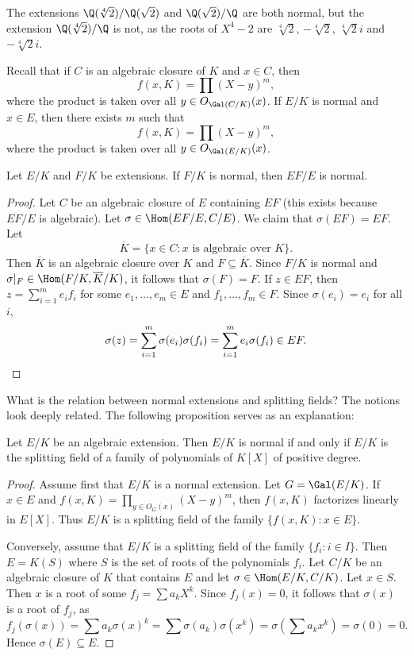 \begin{example}
The extensions $\Q(\sqrt[4]{2})/\Q(\sqrt{2})$ and $\Q(\sqrt{2})/\Q$ are both
normal, but the extension $\Q(\sqrt[4]{2})/\Q$ is not, 
as the roots of $X^4-2$ are
$\sqrt[4]{2}$, $-\sqrt[4]{2}$, $\sqrt[4]{2}i$ and $-\sqrt[4]{2}i$.
\end{example}


Recall that if $C$ is an algebraic closure of $K$ and $x\in C$,
then 
\[
f(x,K)=\prod(X-y)^m,
\]
where the product is taken over all 
$y\in O_{\Gal(C/K)}(x)$. 
If $E/K$ is normal and $x\in E$, then there exists $m$ such that 
\[
f(x,K)=\prod(X-y)^m,
\]
where the product is taken over all 
$y\in O_{\Gal(E/K)}(x)$. 

\begin{proposition}
    Let $E/K$ and $F/K$ be extensions. If $F/K$ 
    is normal, then $EF/E$ is normal.
\end{proposition}

\begin{proof}
    Let $C$ be an algebraic closure of $E$ containing $EF$ (this exists because $EF/E$ is algebraic). 
    Let $\sigma\in\Hom(EF/E,C/E)$. We claim that $\sigma(EF)=EF$. Let 
    \[
    \overline{K}=\{x\in C:x\text{ is algebraic over $K$}\}.
    \]
    Then $\overline{K}$ is an algebraic closure over $K$ and $F\subseteq\overline{K}$. 
    Since $F/K$ is normal and $\sigma|_F\in\Hom(F/K,\overline{K}/K)$, 
    it follows that $\sigma(F)=F$. If $z\in EF$, then
    $z=\sum_{i=1}^m e_if_i$ for some $e_1,\dots,e_m\in E$ and 
    $f_1,\dots,f_m\in F$. Since $\sigma(e_i)=e_i$ for all $i$,  
    \[
    \sigma(z)=\sum_{i=1}^m\sigma(e_i)\sigma(f_i)=\sum_{i=1}^m e_i\sigma(f_i)\in EF.\qedhere 
    \]
\end{proof}

What is the relation between 
normal extensions and splitting fields? The notions look
deeply related. The following proposition serves as an explanation: 

\begin{proposition}
\label{pro:normal<=>dec}
    Let $E/K$ be an algebraic extension. Then 
    $E/K$ is normal if and only if $E/K$ is the splitting field
    of a family of polynomials of $K[X]$ of positive degree.
\end{proposition}

\begin{proof}
    Assume first that $E/K$ is a normal extension. 
    Let $G=\Gal(E/K)$.  If $x\in E$ and $f(x,K)=\prod_{y\in O_G(x)}(X-y)^m$, 
    then $f(x,K)$ factorizes linearly in $E[X]$. Thus 
    $E/K$ is a splitting field of the family 
    $\{f(x,K):x\in E\}$. 
    
    Conversely, assume that $E/K$ is a splitting field of the family 
    $\{f_i:i\in I\}$. Then $E=K(S)$ where $S$ is the set of roots
    of the polynomials $f_i$. Let $C/K$ be an algebraic closure
    of $K$ that contains $E$ and let $\sigma\in\Hom(E/K,C/K)$. Let $x\in S$. 
    Then $x$ is a root of some $f_j=\sum a_kX^k$. Since $f_j(x)=0$, 
    it follows that $\sigma(x)$ is a root of $f_j$, as 
    \[
    f_j(\sigma(x))=\sum a_k\sigma(x)^k
    =\sum\sigma(a_k)\sigma(x^k)
    =\sigma\left(\sum a_kx^k\right)=\sigma(0)=0.
    \]
    Hence $\sigma(E)\subseteq E$. 
\end{proof}

